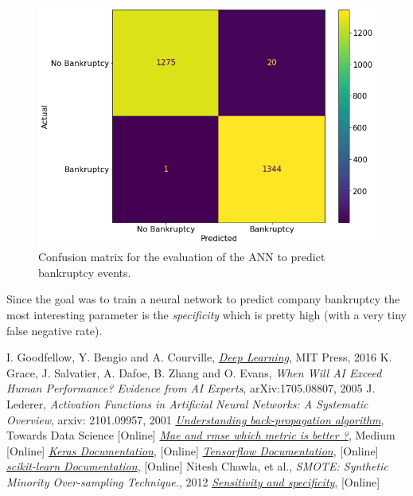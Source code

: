 \begin{figure}[htbp]
\centering
\includegraphics[width=0.7\linewidth]{figures/confusion_matrix}
\caption{Confusion matrix for the evaluation of the ANN to predict bankruptcy events.}
\label{fig:confusion_matrix}
\end{figure}

Since the goal was to train a neural network to predict company bankruptcy the most interesting parameter is the \emph{specificity} which is pretty high (with a very tiny false negative rate).
 
\begin{thebibliography}{9}
 I. Goodfellow, Y. Bengio and A. Courville, \href{http://www.deeplearningbook.org}{\emph{Deep Learning}}, MIT Press, 2016
K. Grace, J. Salvatier, A. Dafoe, B. Zhang and O. Evans, \emph{When Will AI Exceed Human Performance? Evidence from AI Experts}, arXiv:1705.08807, 2005
 J. Lederer, \emph{Activation Functions in Artificial Neural Networks: A Systematic Overview}, arxiv: 2101.09957, 2001
\href{https://towardsdatascience.com/understanding-backpropagation-algorithm-7bb3aa2f95fd}{\emph{Understanding back-propagation algorithm}}, Towards Data Science [Online]
\href{https://medium.com/human-in-a-machine-world/mae-and-rmse-which-metric-is-better-e60ac3bde13d}{\emph{Mae and rmse which metric is better ?}}, Medium [Online]
\href{https://keras.io/}{\emph{Keras Documentation}}, [Online]  
\href{https://www.tensorflow.org/}{\emph{Tensorflow Documentation}}, [Online] 
\href{https://scikit-learn.org/stable/}{\emph{scikit-learn Documentation}}, [Online]
Nitesh Chawla, et al., \emph{SMOTE: Synthetic Minority Over-sampling Technique.}, 2012
\href{https://en.wikipedia.org/wiki/Sensitivity_and_specificity}{\emph{Sensitivity and specificity}}, [Online]
\end{thebibliography}